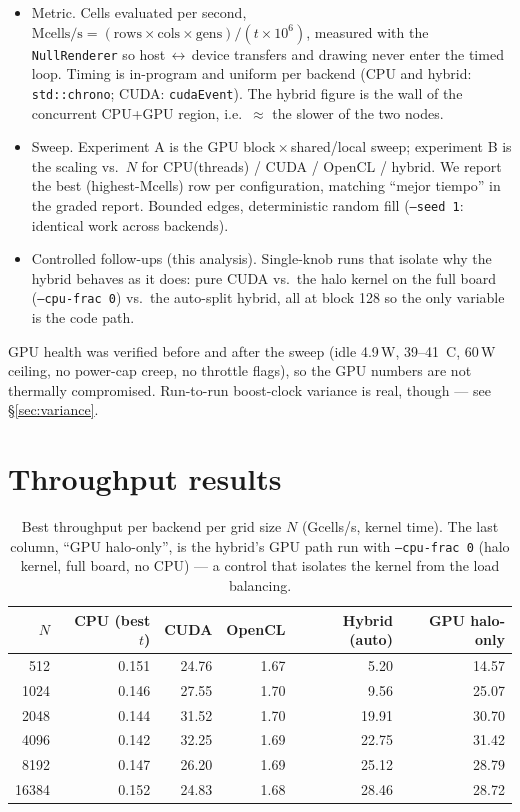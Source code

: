 \documentclass[
	english,
	letterpaper, oneside
]{article}
\begin{document}
\begin{itemize}
	\item Metric. Cells evaluated per second,
	$\text{Mcells/s} = (\text{rows}\times\text{cols}\times\text{gens}) / (t\times10^{6})$,
	measured with the \texttt{NullRenderer} so host\,$\leftrightarrow$\,device
	transfers and drawing never enter the timed loop. Timing is in-program and
	uniform per backend (CPU and hybrid: \texttt{std::chrono}; CUDA:
	\texttt{cudaEvent}). The hybrid figure is the wall of the concurrent CPU+GPU
	region, i.e.\ $\approx$ the slower of the two nodes.
	\item Sweep. Experiment A is the GPU block\,$\times$\,shared/local sweep;
	experiment B is the scaling vs.\ $N$ for CPU(threads) / CUDA / OpenCL / hybrid.
	We report the best (highest-Mcells) row per configuration, matching ``mejor
	tiempo'' in the graded report. Bounded edges, deterministic random fill
	(\texttt{--seed 1}: identical work across backends).
	\item Controlled follow-ups (this analysis). Single-knob runs that isolate why
	the hybrid behaves as it does: pure CUDA vs.\ the halo kernel on the full board
	(\texttt{--cpu-frac 0}) vs.\ the auto-split hybrid, all at block 128 so the only
	variable is the code path.
\end{itemize}

GPU health was verified before and after the sweep (idle 4.9\,W, 39--41\,\textdegree
C, 60\,W ceiling, no power-cap creep, no throttle flags), so the GPU numbers are not
thermally compromised. Run-to-run boost-clock variance is real, though --- see
\S\ref{sec:variance}.

\section{Throughput results}
\label{sec:throughput}

\begin{table}[H]
	\centering
	\caption{Best throughput per backend per grid size $N$ (Gcells/s, kernel time).
	The last column, ``GPU halo-only'', is the hybrid's GPU path run with
	\texttt{--cpu-frac 0} (halo kernel, full board, no CPU) --- a control that
	isolates the kernel from the load balancing.}
	\label{tab:throughput}
	\begin{tabular}{@{}rrrrrr@{}}
		\toprule
		$N$ & CPU (best $t$) & CUDA & OpenCL & Hybrid (auto) & GPU halo-only \\
		\midrule
		512   & 0.151 & 24.76 & 1.67 & 5.20  & 14.57 \\
		1024  & 0.146 & 27.55 & 1.70 & 9.56  & 25.07 \\
		2048  & 0.144 & 31.52 & 1.70 & 19.91 & 30.70 \\
		4096  & 0.142 & 32.25 & 1.69 & 22.75 & 31.42 \\
		8192  & 0.147 & 26.20 & 1.69 & 25.12 & 28.79 \\
		16384 & 0.152 & 24.83 & 1.68 & 28.46 & 28.72 \\
		\bottomrule
	\end{tabular}
\end{table}
\end{document}
